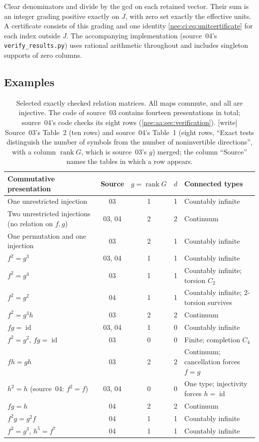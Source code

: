 \documentclass[11pt,letterpaper]{article}
\numberwithin{equation}{section}
\theoremstyle{plain}
\theoremstyle{definition}
\theoremstyle{remark}
\newcommand{\id}{\operatorname{id}}
\newcommand{\rank}{\operatorname{rank}}
\begin{document}
Clear denominators and divide by the gcd on each retained
vector. Their sum is an integer grading positive exactly
on $J$, with zero set exactly the effective units.
A certificate consists of this grading and one identity
\eqref{nee:ci:eq:unitcertificate} for each index outside $J$.
The accompanying implementation (source~04's \texttt{verify\_results.py}) uses rational arithmetic
throughout and includes singleton supports of zero columns.

\subsection{Examples}

\begin{table}[tbp]
\centering\small
\begin{tabular}{L{0.36\textwidth}cccL{0.27\textwidth}}
\toprule
Commutative presentation & Source & $g=\rank G$ & $d$ & Connected types \\
\midrule
One unrestricted injection & 03 & 1 & 1 & Countably infinite \\
Two unrestricted injections (no relation on $f,g$) & 03, 04 & 2 & 2 & Continuum \\
One permutation and one injection & 03 & 2 & 1 & Countably infinite \\
$f^2=g^3$ & 03, 04 & 1 & 1 & Countably infinite \\
$f^2=g^4$ & 03 & 1 & 1 & Countably infinite; torsion $C_2$ \\
$f^2=g^2$ & 04 & 1 & 1 & Countably infinite; $2$-torsion survives \\
$f^2=g^3h$ & 03 & 2 & 2 & Continuum \\
$fg=\id$ & 03, 04 & 1 & 0 & Countably infinite \\
$f^2=g^2$, $fg=\id$ & 03 & 0 & 0 & Finite; completion $C_4$ \\
$fh=gh$ & 03 & 2 & 2 & Continuum; cancellation forces $f=g$ \\
$h^2=h$ (source~04: $f^2=f$) & 03, 04 & 0 & 0 & One type; injectivity forces $h=\id$ \\
$fg=h$ & 04 & 2 & 2 & Continuum \\
$f^2g=g^2f$ & 04 & 1 & 1 & Countably infinite \\
$f^2=g^3$, $h^5=f^7$ & 04 & 1 & 1 & Countably infinite \\
\bottomrule
\end{tabular}
\caption{Selected exactly checked relation matrices. All maps commute, and
all are injective. The code of source~03 contains fourteen presentations in total; source~04's code checks its eight rows (\cref{nee:aa:sec:verification}). [write] Source~03's Table~2 (ten rows) and source~04's Table~1 (eight rows, ``Exact tests distinguish the number of symbols from the number of noninvertible directions'', with a column $\rank G$, which is source~03's $g$) merged; the column ``Source'' names the tables in which a row appears.}
\label{nee:aa:tab:presentations}
\label{nee:ci:tab:presentation}
\end{table}
\end{document}
